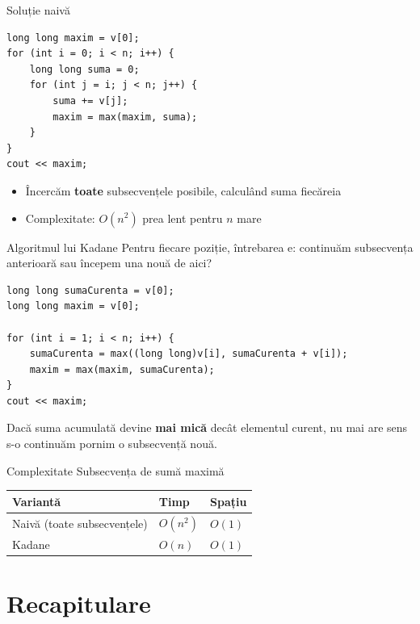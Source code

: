 ﻿\documentclass{beamer}
\begin{document}
\begin{frame}[fragile]{Soluție naivă}
  \begin{lstlisting}
long long maxim = v[0];
for (int i = 0; i < n; i++) {
    long long suma = 0;
    for (int j = i; j < n; j++) {
        suma += v[j];
        maxim = max(maxim, suma);
    }
}
cout << maxim;
  \end{lstlisting}
  \begin{itemize}
    \item Încercăm \textbf{toate} subsecvențele posibile, calculând suma fiecăreia
    \item Complexitate: $O(n^2)$ \textemdash{} prea lent pentru $n$ mare
  \end{itemize}
\end{frame}

\begin{frame}[fragile]{Algoritmul lui Kadane}
  Pentru fiecare poziție, întrebarea e: continuăm subsecvența anterioară sau începem una nouă de aici?
  \begin{lstlisting}
long long sumaCurenta = v[0];
long long maxim = v[0];

for (int i = 1; i < n; i++) {
    sumaCurenta = max((long long)v[i], sumaCurenta + v[i]);
    maxim = max(maxim, sumaCurenta);
}
cout << maxim;
  \end{lstlisting}
  Dacă suma acumulată devine \textbf{mai mică} decât elementul curent, nu mai are sens s-o continuăm \textemdash{} pornim o subsecvență nouă.
\end{frame}

\begin{frame}{Complexitate \textemdash{} Subsecvența de sumă maximă}
  \begin{center}
  \begin{tabular}{lll}
    \toprule
    Variantă & Timp & Spațiu \\
    \midrule
    Naivă (toate subsecvențele) & $O(n^2)$ & $O(1)$ \\
    Kadane                      & $O(n)$   & $O(1)$ \\
    \bottomrule
  \end{tabular}
  \end{center}
\end{frame}

\section{Recapitulare}
\end{document}
